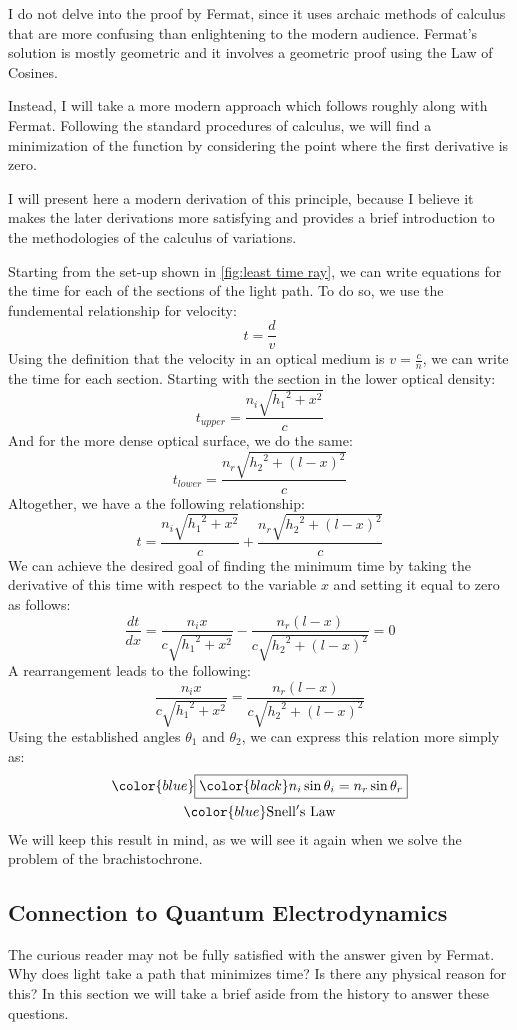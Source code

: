 I do not delve into the proof by Fermat, since it uses archaic methods of calculus that are more confusing than enlightening to the modern audience. Fermat's solution is mostly geometric and it involves a geometric proof using the Law of Cosines. 

Instead, I will take a more modern approach which follows roughly along with Fermat. Following the standard procedures of calculus, we will find a minimization of the function by considering the point where the first derivative is zero.

I will present here a modern derivation of this principle, because I believe it makes the later derivations more satisfying and provides a brief introduction to the methodologies of the calculus of variations.

Starting from the set-up shown in \autoref{fig:least time ray}, we can write equations for the time for each of the sections of the light path. To do so, we use the fundemental relationship for velocity:
$$t=\frac{d}{v}$$
Using the definition that the velocity in an optical medium is $v=\frac{c}{n}$, we can write the time for each section. Starting with the section in the lower optical density:
$$t_{upper}=\frac{n_i\sqrt{{h_1}^2+x^2}}{c}$$
And for the more dense optical surface, we do the same:
$$t_{lower}=\frac{n_r\sqrt{{h_2}^2+(l-x)^2}}{c}$$
Altogether, we have a the following relationship:
$$t=\frac{n_i\sqrt{{h_1}^2+x^2}}{c}+\frac{n_r\sqrt{{h_2}^2+(l-x)^2}}{c}$$
We can achieve the desired goal of finding the minimum time by taking the derivative of this time with respect to the variable $x$ and setting it equal to zero as follows:
$$\frac{dt}{dx}=\frac{n_ix}{c\sqrt{{h_1}^2+x^2}}-\frac{n_r(l-x)}{c\sqrt{{h_2}^2+(l-x)^2}}=0$$
A rearrangement leads to the following:
$$\frac{n_ix}{c\sqrt{{h_1}^2+x^2}}=\frac{n_r(l-x)}{c\sqrt{{h_2}^2+(l-x)^2}}$$
Using the established angles $\theta_1$ and $\theta_2$, we can express this relation more simply as:
\begin{gather}
    \color{blue}\boxed{\color{black}n_i\sin\theta_i=n_r\sin\theta_r}\\
    \color{blue}\mathrm{Snell's \ Law}
\end{gather}
We will keep this result in mind, as we will see it again when we solve the problem of the \gls{brachistochrone}.

\subsection{Connection to Quantum Electrodynamics}\label{sec: connection to quantum}
The curious reader may not be fully satisfied with the answer given by Fermat. Why does light take a path that minimizes time? Is there any physical reason for this? In this section we will take a brief aside from the history to answer these questions.

